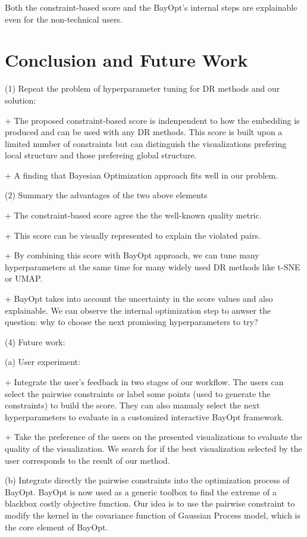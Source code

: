 \par
Both the constraint-based score and the BayOpt's internal steps are explainable even for the non-technical users. 



\section{Conclusion and Future Work}

\par (1) Repeat the problem of hyperparameter tuning for DR methods and our solution:

+ The proposed constraint-based score is indenpendent to how the embedding is produced and can be used with any DR methods.
This score is built upon a limited number of constraints but can distinguish the visualizations prefering local structure and those prefereing global structure.

+ A finding that Bayesian Optimization approach fits well in our problem.


\vspace{8pt}
\par (2) Summary the advantages of the two above elements

+ The constraint-based score agree the the well-known quality metric.

+ This score can be visually represented to explain the violated pairs.

+ By combining this score with BayOpt approach, we can tune many hyperparameters at the same time for many widely used DR methods like t-SNE or UMAP.

+ BayOpt takes into account the uncertainty in the score values and also explainable. We can observe the internal optimization step to anwser the question: why to choose the next promissing hyperparameters to try?


\vspace{8pt}
\par (4) Future work:

(a) User experiment:

+ Integrate the user's feedback in two stages of our workflow.
The users can select the pairwise constraints or label some points (used to generate the constraints) to build the score.
They can also manualy select the next hyperparameters to evaluate in a customized interactive BayOpt framework.

+ Take the preference of the users on the presented visualizations to evaluate the quality of the visualization. We search for if the best visualization selected by the user corresponds to the result of our method.


(b) Integrate directly the pairwise constraints into the optimization process of BayOpt.
BayOpt is now used as a generic toolbox to find the extreme of a blackbox costly objective function.
Our idea is to use the pairwise constraint to modify the kernel in the covariance function of Gaussian Process model, which is the core element of BayOpt.
